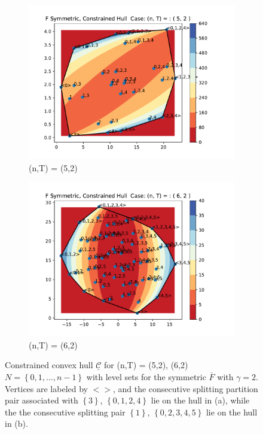 \documentclass{article}
\theoremstyle{case}
\begin{document}
\vspace{16pt}
\begin{figure}
\centering
\begin{subfigure}{.5\textwidth}
  \centering
  \includegraphics[scale=.55]{const_hull_5_2.pdf}
  \caption{(n,T) = (5,2)}
  \label{fig:sub1}
\end{subfigure}%
\begin{subfigure}{.5\textwidth}
  \centering
  \includegraphics[scale=.55]{const_hull_6_2.pdf}
  \caption{(n,T) = (6,2)}
  \label{fig:sub2}
\end{subfigure}
\caption{Constrained convex hull $\underline{\mathcal{C}}$ for (n,T) = (5,2), (6,2) $N = \left\lbrace 0,1, \dots, n-1 \right\rbrace$ with level sets for the symmetric $\overline{F}$ with $\gamma = 2$. Vertices are labeled by $<>$, and the consecutive splitting partition pair associated with $\left\lbrace 3\right\rbrace$, $\left\lbrace 0, 1, 2, 4\right\rbrace$ lie on the hull in (a), while the the consecutive splitting pair $\left\lbrace 1\right\rbrace$, $\left\lbrace 0, 2, 3, 4, 5\right\rbrace$ lie on the hull in (b).}
\label{fig:hull1}
\end{figure}
\end{document}
